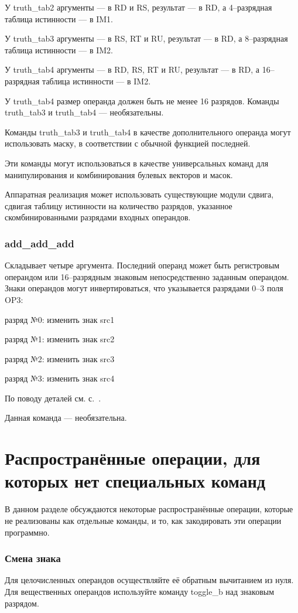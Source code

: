 \documentclass[forwardcom.tex]{subfiles}
\begin{document}
У truth\_tab2 аргументы --- в RD и RS, результат --- в RD, а 4--разрядная таблица истинности --- в IM1.

У truth\_tab3 аргументы --- в RS, RT и RU, результат --- в RD, а 8--разрядная таблица истинности --- в IM2.

У truth\_tab4 аргументы --- в RD, RS, RT и RU, результат --- в RD, а 16--разрядная таблица истинности --- в IM2.

У truth\_tab4 размер операнда должен быть не менее 16 разрядов. Команды truth\_tab3 и truth\_tab4 --- необязательны.

Команды truth\_tab3 и truth\_tab4 в качестве дополнительного операнда могут использовать маску, в соответствии с обычной функцией последней.

Эти команды могут использоваться в качестве универсальных команд для манипулирования и комбинирования булевых векторов и масок.

Аппаратная реализация может использовать существующие модули сдвига, сдвигая таблицу истинности на количество разрядов, указанное скомбинированными разрядами входных операндов.

\subsubsection{add\_add\_add} \label{addAddAdd}
Складывает четыре аргумента. Последний операнд может быть регистровым операндом или 16--разрядным знаковым непосредственно заданным операндом. Знаки операндов могут инвертироваться, что указывается разрядами 0--3 поля OP3:

разряд №0: изменить знак src1

разряд №1: изменить знак src2

разряд №2: изменить знак src3

разряд №3: изменить знак src4

По поводу деталей см. с.~\pageref{addAdd}.

Данная команда --- необязательна.

\section{Распространённые операции, для которых нет специальных команд}
В данном разделе обсуждаются некоторые распространённые операции, которые не реализованы как отдельные команды, и то, как закодировать эти операции программно.

\subsubsection{Смена знака}
Для целочисленных операндов осуществляйте её обратным вычитанием из нуля. Для вещественных операндов используйте команду toggle\_b над знаковым разрядом.
\end{document}
